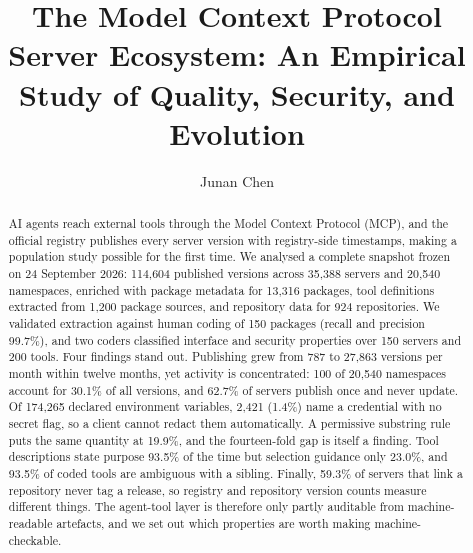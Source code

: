 \documentclass[a4paper,fleqn]{cas-dc}
\begin{document}
\let\WriteBookmarks\relax
\def\floatpagepagefraction{1}
\def\textpagefraction{.001}


\title[mode=title]{The Model Context Protocol Server Ecosystem:
An Empirical Study of Quality, Security, and Evolution}

\author[1]{Junan Chen}
\cormark[1]



\begin{abstract}
AI agents reach external tools through the Model Context Protocol (MCP), and
the official registry publishes every server version with registry-side
timestamps, making a population study possible for the first time. We
analysed a complete snapshot frozen on 24 September 2026: 114,604 published
versions across 35,388 servers and 20,540 namespaces, enriched with package
metadata for 13,316 packages, tool definitions extracted from 1,200 package
sources, and repository data for 924 repositories. We validated extraction
against human coding of 150 packages (recall and precision 99.7\%), and two
coders classified interface and security properties over 150 servers
and 200 tools. Four findings stand out. Publishing grew from
787 to 27,863 versions per month within twelve months, yet activity is
concentrated: 100 of 20,540 namespaces account for 30.1\% of all versions, and
62.7\% of servers publish once and never update. Of 174,265 declared
environment variables, 2,421 (1.4\%) name a credential with no secret flag, so
a client cannot redact them automatically. A permissive substring rule puts the
same quantity at 19.9\%, and the fourteen-fold gap is itself a finding. Tool
descriptions state purpose 93.5\% of the time but selection guidance only
23.0\%, and 93.5\% of coded tools are ambiguous with a sibling. Finally, 59.3\%
of servers that link a repository never tag a release, so registry and
repository version counts measure different things. The agent-tool layer is
therefore only partly auditable from
machine-readable artefacts, and we set out which properties are worth making
machine-checkable.
\end{abstract}
\end{document}
